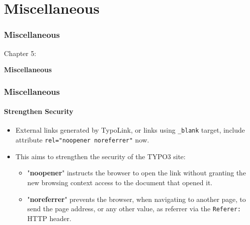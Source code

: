 %

\section{Miscellaneous}
\begin{frame}[fragile]
	\frametitle{Miscellaneous}

	\begin{center}\huge{Chapter 5:}\end{center}
	\begin{center}\huge{\color{typo3darkgrey}\textbf{Miscellaneous}}\end{center}

\end{frame}


\begin{frame}[fragile]
	\frametitle{Miscellaneous}
	\framesubtitle{Strengthen Security}

	\begin{itemize}
		\item External links generated by TypoLink, or links using \texttt{\_blank}
			target, include attribute \texttt{rel="noopener noreferrer"} now.
		\item This aims to strengthen the security of the TYPO3 site:

			\begin{itemize}
				\item "\textbf{noopener}" instructs the browser to open the link without
					granting the new browsing context access to the document that opened it.
				\item "\textbf{noreferrer}" prevents the browser, when navigating to another page,
					to send the page address, or any other value, as referrer via the
					\texttt{Referer:} HTTP header.
			\end{itemize}

	\end{itemize}

\end{frame}

